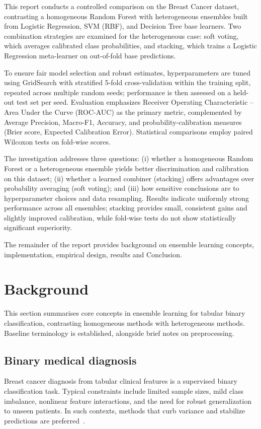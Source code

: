 \documentclass[conference]{IEEEtran}
\begin{document}
This report conducts a controlled comparison on the Breast Cancer dataset, contrasting a homogeneous Random Forest with heterogeneous ensembles built from Logistic Regression, SVM (RBF), and Decision Tree base learners. Two combination strategies are examined for the heterogeneous case: soft voting, which averages calibrated class probabilities, and stacking, which trains a Logistic Regression meta-learner on out-of-fold base predictions. 

To ensure fair model selection and robust estimates, hyperparameters are tuned using GridSearch with stratified 5-fold cross-validation within the training split, repeated across multiple random seeds; performance is then assessed on a held-out test set per seed. Evaluation emphasizes Receiver Operating Characteristic – Area Under the Curve (ROC-AUC) as the primary metric, complemented by Average Precision, Macro-F1, Accuracy, and probability-calibration measures (Brier score, Expected Calibration Error). Statistical comparisons employ paired Wilcoxon tests on fold-wise scores.

The investigation addresses three questions: (i) whether a homogeneous Random Forest or a heterogeneous ensemble yields better discrimination and calibration on this dataset; (ii) whether a learned combiner (stacking) offers advantages over probability averaging (soft voting); and (iii) how sensitive conclusions are to hyperparameter choices and data resampling. Results indicate uniformly strong performance across all ensembles; stacking provides small, consistent gains and slightly improved calibration, while fold-wise tests do not show statistically significant superiority.

The remainder of the report provides background on ensemble learning concepts, implementation, empirical  design, results and Conclusion. 

\section{\textbf{Background}}
This section summarises core concepts in ensemble learning for tabular binary classification, contrasting homogeneous methods with heterogeneous methods. Baseline terminology is established, alongside brief notes on preprocessing.
\label{sec:background}

\subsection{Binary medical diagnosis }
Breast cancer diagnosis from tabular clinical features is a supervised binary classification task. Typical constraints include limited sample sizes, mild class imbalance, nonlinear feature interactions, and the need for robust generalization to unseen patients. In such contexts, methods that curb variance and stabilize predictions are preferred~\cite{kelleher2020fundamentals}.
\end{document}
